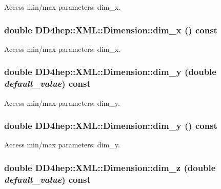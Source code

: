 Access min/max parameters: dim\_\-x. \hypertarget{struct_d_d4hep_1_1_x_m_l_1_1_dimension_a643e3deada8984ade3cf833ad125e894}{
\subsubsection[{dim\_\-x}]{\setlength{\rightskip}{0pt plus 5cm}double DD4hep::XML::Dimension::dim\_\-x () const}}
\label{struct_d_d4hep_1_1_x_m_l_1_1_dimension_a643e3deada8984ade3cf833ad125e894}


Access min/max parameters: dim\_\-x. \hypertarget{struct_d_d4hep_1_1_x_m_l_1_1_dimension_aee1c5cc11394f26c6bce53ef3d9f1031}{
\subsubsection[{dim\_\-y}]{\setlength{\rightskip}{0pt plus 5cm}double DD4hep::XML::Dimension::dim\_\-y (double {\em default\_\-value}) const}}
\label{struct_d_d4hep_1_1_x_m_l_1_1_dimension_aee1c5cc11394f26c6bce53ef3d9f1031}


Access min/max parameters: dim\_\-y. \hypertarget{struct_d_d4hep_1_1_x_m_l_1_1_dimension_a3fd03ae8bb045a971ac545650ea123bf}{
\subsubsection[{dim\_\-y}]{\setlength{\rightskip}{0pt plus 5cm}double DD4hep::XML::Dimension::dim\_\-y () const}}
\label{struct_d_d4hep_1_1_x_m_l_1_1_dimension_a3fd03ae8bb045a971ac545650ea123bf}


Access min/max parameters: dim\_\-y. \hypertarget{struct_d_d4hep_1_1_x_m_l_1_1_dimension_af341d18d7b00332ade3d458204054de6}{
\subsubsection[{dim\_\-z}]{\setlength{\rightskip}{0pt plus 5cm}double DD4hep::XML::Dimension::dim\_\-z (double {\em default\_\-value}) const}}
\label{struct_d_d4hep_1_1_x_m_l_1_1_dimension_af341d18d7b00332ade3d458204054de6}


